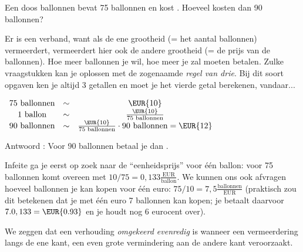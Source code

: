\begin{voorbeeld}
	Een doos ballonnen bevat 75 ballonnen en kost . Hoeveel kosten
dan 90 ballonnen?

Er is een verband, want als de ene grootheid (= het aantal ballonnen)
vermeerdert, vermeerdert hier ook de andere grootheid (= de prijs
van de ballonnen). Hoe meer ballonnen je wil, hoe meer je zal moeten
betalen. Zulke vraagstukken kan je oplossen met de zogenaamde \emph{regel
van drie}. Bij dit soort opgaven ken je altijd 3 getallen en moet
je het vierde getal berekenen, vandaar...



$\begin{array}{ccc}
75 ~\text{ballonnen} & \sim & \text{\EUR{10}} \\
1 ~\text{ballon} & \sim & \frac{\text{\EUR{10}}}{75 \text{ ballonnen}} \\ 
90 ~\text{ballonnen} & \sim & \frac{\text{\EUR{10}}}{75 \text{ ballonnen}}\cdot 90 \text{ ballonnen} = \text{\EUR{12}}\\ 
\end{array}$

Antwoord : Voor 90 ballonnen betaal je dan .

Infeite ga je eerst op zoek naar de ``eenheidsprijs'' voor \'e\'en ballon:
 voor 75 ballonnen komt overeen met $10/75=0,133\frac{\text{EUR}}{\text{ballon}}$.
We kunnen ons ook afvragen hoeveel ballonnen je kan kopen voor \'e\'en
euro: $75/10=7,5\frac{\text{ballonnen}}{\text{EUR}}$ (praktisch zou dit betekenen dat je met \'e\'en euro 7 ballonnen kan kopen; je betaalt daarvoor $7.0,133=\text{\EUR{0.93}}$
en je houdt nog 6 eurocent over). \bigskip{}

\end{voorbeeld}

We zeggen dat een verhouding \emph{omgekeerd evenredig} is wanneer
een vermeerdering langs de ene kant, een even grote vermindering aan
de andere kant veroorzaakt. 



